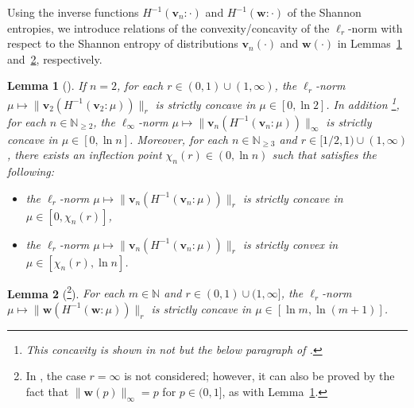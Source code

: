 \documentclass[conference, draftcls, onecolumn]{IEEEtran}
\theoremstyle{plain}
\newtheorem{lemma}{Lemma}
\newcommand{\bvec}[1]{\boldsymbol{#1}}
\newcommand{\lemref}[1]{Lemma~\ref{#1}}
\begin{document}
Using the inverse functions $H^{-1}( \bvec{v}_{n} : \cdot )$ and $H^{-1}( \bvec{w} : \cdot )$ of the Shannon entropies, we introduce relations of the convexity/concavity of the $\ell_{r}$-norm with respect to the Shannon entropy of distributions $\bvec{v}_{n}( \cdot )$ and $\bvec{w}( \cdot )$ in Lemmas~\ref{lem:Hconvex_v} and~\ref{lem:Hconvex_w}, respectively.





\begin{lemma}[{\cite[Lemma~2]{part2}}]
\label{lem:Hconvex_v}
If $n = 2$, for each $r \in (0, 1) \cup (1, \infty)$, the $\ell_{r}$-norm $\mu \mapsto \| \bvec{v}_{2}( H^{-1}( \bvec{v}_{2} : \mu ) ) \|_{r}$ is strictly concave in $\mu \in [0, \ln 2]$. In addition%
\footnote{This concavity is shown in not \cite[Lemma~2]{part2} but the below paragraph of \cite[Lemma~2]{part2}.},
for each $n \in \mathbb{N}_{\ge 2}$, the $\ell_{\infty}$-norm $\mu \mapsto \| \bvec{v}_{n}( H^{-1}( \bvec{v}_{n} : \mu ) ) \|_{\infty}$ is strictly concave in $\mu \in [0, \ln n]$.
Moreover, for each $n \in \mathbb{N}_{\ge 3}$ and $r \in [1/2, 1) \cup (1, \infty)$, there exists an inflection point $\chi_{n}( r ) \in (0, \ln n)$ such that satisfies the following:
\begin{itemize}
\item
the $\ell_{r}$-norm $\mu \mapsto \| \bvec{v}_{n}( H^{-1}( \bvec{v}_{n} : \mu ) ) \|_{r}$ is strictly concave in $\mu \in [0, \chi_{n}( r )]$,
\item
the $\ell_{r}$-norm $\mu \mapsto \| \bvec{v}_{n}( H^{-1}( \bvec{v}_{n} : \mu ) ) \|_{r}$ is strictly convex in $\mu \in [\chi_{n}( r ), \ln n]$.
\end{itemize}
\end{lemma}



\begin{lemma}[{\cite[Lemma~3]{part2}\footnote{In \cite[Lemma~3]{part2}, the case $r = \infty$ is not considered; however, it can also be proved by the fact that $\| \bvec{w}( p ) \|_{\infty} = p$ for $p \in (0, 1]$, as with \lemref{lem:Hconvex_v}.}}]
\label{lem:Hconvex_w}
For each $m \in \mathbb{N}$ and $r \in (0, 1) \cup (1, \infty]$, the $\ell_{r}$-norm $\mu \mapsto \| \bvec{w}( H^{-1}( \bvec{w} : \mu ) ) \|_{r}$ is strictly concave in $\mu \in [\ln m, \ln(m+1)]$.
\end{lemma}
\end{document}
